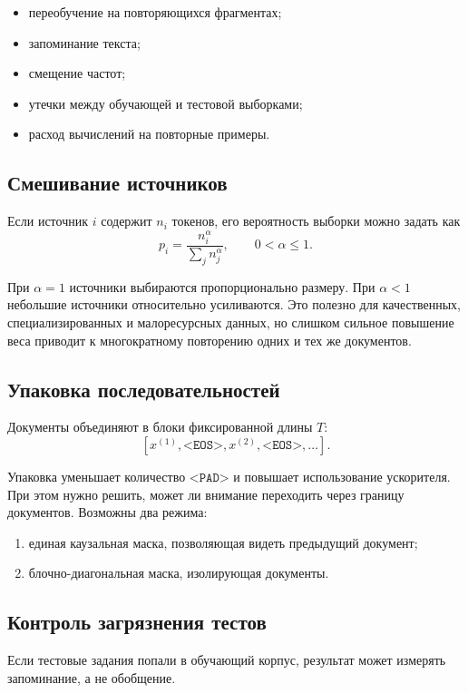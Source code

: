 \documentclass[12pt,a4paper]{article}
\newcommand{\1}{\mathbf{1}}
\theoremstyle{definition}
\theoremstyle{remark}
\begin{document}
\begin{itemize}
    \item переобучение на повторяющихся фрагментах;
    \item запоминание текста;
    \item смещение частот;
    \item утечки между обучающей и тестовой выборками;
    \item расход вычислений на повторные примеры.
\end{itemize}

\subsection{Смешивание источников}

Если источник $i$ содержит $n_i$ токенов, его вероятность выборки можно
задать как
\[
p_i=
\frac{n_i^\alpha}
{\sum_j n_j^\alpha},
\qquad 0<\alpha\leq 1.
\]

При $\alpha=1$ источники выбираются пропорционально размеру. При
$\alpha<1$ небольшие источники относительно усиливаются. Это полезно для
качественных, специализированных и малоресурсных данных, но слишком
сильное повышение веса приводит к многократному повторению одних и тех
же документов.

\subsection{Упаковка последовательностей}

Документы объединяют в блоки фиксированной длины $T$:
\[
[x^{(1)},\texttt{<EOS>},x^{(2)},\texttt{<EOS>},\ldots].
\]

Упаковка уменьшает количество $\texttt{<PAD>}$ и повышает использование
ускорителя. При этом нужно решить, может ли внимание переходить через
границу документов. Возможны два режима:

\begin{enumerate}
    \item единая каузальная маска, позволяющая видеть предыдущий документ;
    \item блочно-диагональная маска, изолирующая документы.
\end{enumerate}

\subsection{Контроль загрязнения тестов}

Если тестовые задания попали в обучающий корпус, результат может
измерять запоминание, а не обобщение.
\end{document}
